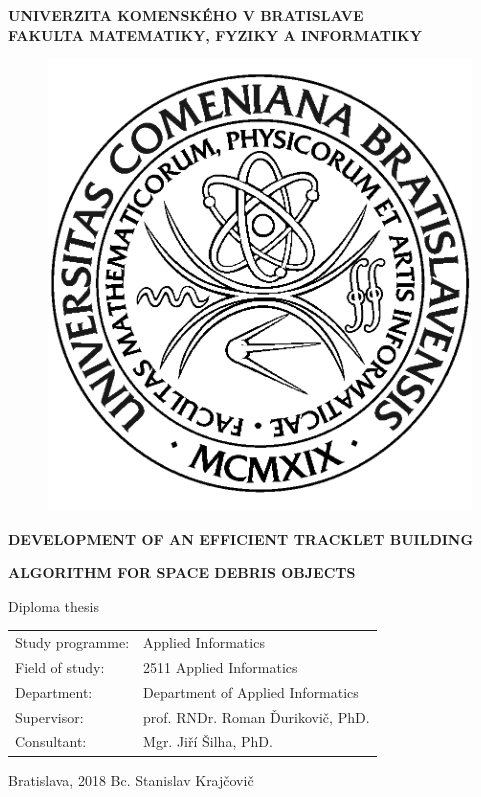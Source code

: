 \documentclass[12pt, a4paper, oneside]{book}
\newcommand{\mfthesistype}{Diploma thesis}
\newcommand{\mfauthor}{Bc. Stanislav Krajčovič}
\newcommand{\mfadvisor}{prof. RNDr. Roman Ďurikovič, PhD.}
\newcommand{\mfplacedate}{Bratislava, 2018}
\newcommand{\mfuniversity}{UNIVERZITA KOMENSKÉHO V BRATISLAVE}
\newcommand{\mffaculty}{FAKULTA MATEMATIKY, FYZIKY A INFORMATIKY}
\begin{document}
\thispagestyle{empty}

\noindent
\begin{minipage}{\textwidth}
\begin{center}
\textbf{\mfuniversity \\
\mffaculty}
\end{center}
\end{minipage}

\vfill
\begin{figure}[!hbt]
\begin{center}
\includegraphics{images/logo_fmph}
\label{img:logo}
\end{center}
\end{figure}
\begin{center}
\begin{minipage}{0.8\textwidth}
\centerline{\textbf{\Large\MakeUppercase{Development of an efficient tracklet building }}}
\smallskip
\centerline{\textbf{\Large\MakeUppercase{algorithm for space debris objects}}}
\smallskip
\centerline{\mfthesistype}
\end{minipage}
\end{center}
\vfill
\begin{tabular}{l l}
Study programme: & Applied Informatics\\
Field of study: & 2511 Applied Informatics\\
Department: & Department of Applied Informatics\\
Supervisor: & \mfadvisor \\
Consultant: & Mgr. Jiří Šilha, PhD.
\end{tabular}
\vfill
\noindent
\mfplacedate \hfill
\mfauthor
\eject 
\end{document}
